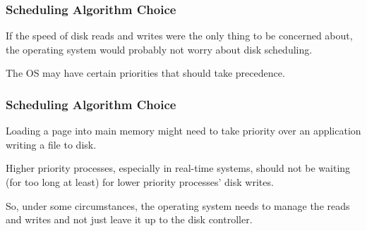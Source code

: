 \begin{frame}
\frametitle{Scheduling Algorithm Choice}

If the speed of disk reads and writes were the only thing to be concerned about, the operating system would probably not worry about disk scheduling.

The OS may have certain priorities that should take precedence. 

\end{frame}

\begin{frame}
\frametitle{Scheduling Algorithm Choice}


Loading a page into main memory might need to take priority over an application writing a file to disk. 

Higher priority processes, especially in real-time systems, should not be waiting (for too long at least) for lower priority processes' disk writes. 

So, under some circumstances, the operating system needs to manage the reads and writes and not just leave it up to the disk controller.

\end{frame}



